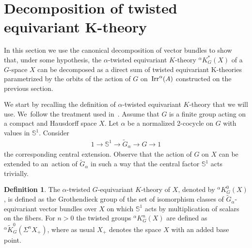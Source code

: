 \documentclass[pdftex]{sigma}
\def\S{\mathbb{S}}
\DeclareMathOperator{\Irr}{\textup{Irr}}
\theoremstyle{definition}
\newtheorem{Def}[Th]{Definition}
\numberwithin{equation}{section}
\begin{document}
%
%

\section[Decomposition of twisted equivariant K-theory]
{Decomposition of twisted equivariant $\boldsymbol K$-theory}\label{Section 3}

In this section we use the canonical decomposition of vector bundles to show that,
under some hypothesis, the $\alpha$-twisted equivariant $K$-theory $^{\alpha}K^{\ast}_{G}(X)$ of a
$G$-space $X$ can be decomposed as a direct sum of twisted equivariant K-theories parametrized
by the orbits of the action of $G$ on~$\Irr^{\alpha}(A)$ constructed on the previous section.

We start by recalling the definition of $\alpha$-twisted equivariant $K$-theory that we will use.
We~fol\-low the treatment used in~\cite[Section 7.2]{AdemRuan}.
Assume that $G$ is a finite group acting on a compact and Hausdorff space $X$.
Let $\alpha$ be a normalized 2-cocycle on $G$ with values in $\S^{1}$. Consider
\begin{gather*}
1\rightarrow \S^{1}\rightarrow \widetilde{G}_{\alpha}\rightarrow G\rightarrow 1
\end{gather*}
the corresponding central extension. Observe that the action of $G$ on $X$ can be
extended to an~action of $\widetilde{G}_{\alpha}$ in such a way that the central factor $\S^{1}$
acts trivially.

\begin{Def}\label{usualdeftwisted}
The $\alpha$-twisted $G$-equivariant $K$-theory of $X$, denoted by $^{\alpha}K_{G}^{0}(X)$,
is defined as the Grothendieck group of the set of isomorphism classes of
$\widetilde{G}_{\alpha}$-equivariant vector bundles over $X$ on which
$\S^{1}$ acts by multiplication of scalars on the fibers. For $n>0$ the twisted groups
$^{\alpha}K_{G}^{n}(X)$ are defined as
$^{\alpha}\tilde{K}_{G}^{0}(\Sigma^{n}X_{+})$, where as usual $X_{+}$
denotes the space $X$ with an added base point.
\end{Def}
\end{document}
